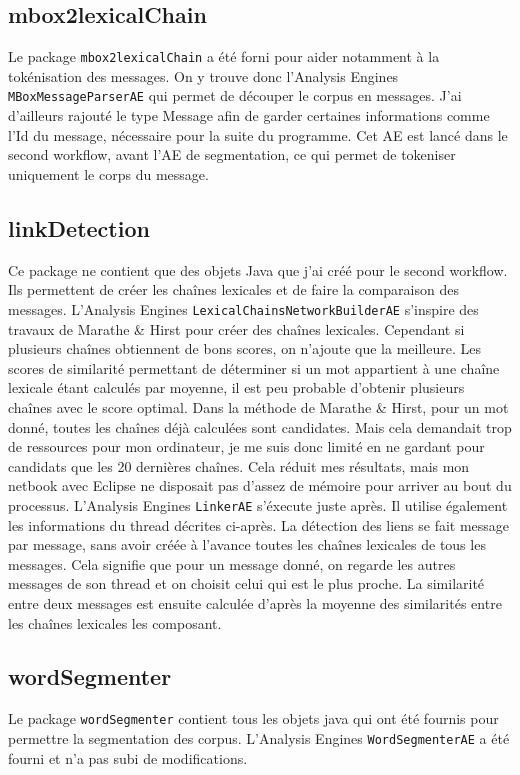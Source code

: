 \documentclass[a4paper]{article}
\begin{document}
	\subsection{mbox2lexicalChain}
	Le package \texttt{mbox2lexicalChain} a été forni pour aider notamment à la tokénisation des messages. On y trouve donc l'Analysis Engines \texttt{MBoxMessageParserAE} qui permet de découper le corpus en messages. J'ai d'ailleurs rajouté le type Message afin de garder certaines informations comme l’Id du message, nécessaire pour la suite du programme. Cet AE est lancé dans le second workflow, avant l'AE de segmentation, ce qui permet de tokeniser uniquement le corps du message.

	\subsection{linkDetection}
	Ce package ne contient que des objets Java que j'ai créé pour le second workflow. Ils permettent de créer les chaînes lexicales et de faire la comparaison des messages. L'Analysis Engines \texttt{LexicalChainsNetworkBuilderAE} s’inspire des travaux de Marathe \& Hirst pour créer des chaînes lexicales. Cependant si plusieurs chaînes obtiennent de bons scores, on n’ajoute que la meilleure. Les scores de similarité permettant de déterminer si un mot appartient à une chaîne lexicale étant calculés par moyenne, il est peu probable d’obtenir plusieurs chaînes avec le score optimal. Dans la méthode de Marathe \& Hirst, pour un mot donné, toutes les chaînes déjà calculées sont candidates. Mais cela demandait trop de ressources pour mon ordinateur, je me suis donc limité en ne gardant pour candidats que les 20 dernières chaînes. Cela réduit mes résultats, mais mon netbook avec Eclipse ne disposait pas d'assez de mémoire pour arriver au bout du processus. L'Analysis Engines \texttt{LinkerAE} s'éxecute juste après. Il utilise également les informations du thread décrites ci-après. La détection des liens se fait message par message, sans avoir créée à l'avance toutes les chaînes lexicales de tous les messages. Cela signifie que pour un message donné, on regarde les autres messages de son thread et on choisit celui qui est le plus proche. La similarité entre deux messages est ensuite calculée d’après la moyenne des similarités entre les chaînes lexicales les composant.

	\subsection{wordSegmenter}
	Le package \texttt{wordSegmenter} contient tous les objets java qui ont été fournis pour permettre la segmentation des corpus. L'Analysis Engines \texttt{WordSegmenterAE} a été fourni et n'a pas subi de modifications.
\end{document}
